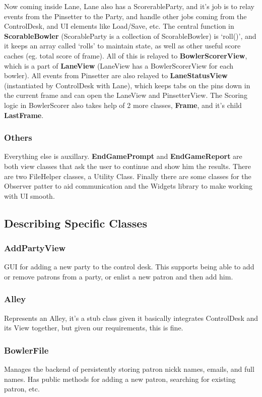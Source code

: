 Now coming inside Lane, Lane also has a ScorerableParty, and it's job is to relay events from the Pinsetter to the Party, and handle other jobs coming from the ControlDesk, and UI elements like Load/Save, etc. The central function in \textbf{ScorableBowler} (ScorableParty is a collection of ScorableBowler) is `roll()', and it keeps an array called `rolls' to maintain state, as well as other useful score caches (eg. total score of frame). All of this is relayed to \textbf{BowlerScorerView}, which is a part of \textbf{LaneView} (LaneView has a BowlerScorerView for each bowler). All events from Pinsetter are also relayed to \textbf{LaneStatusView} (instantiated by ControlDesk with Lane), which keeps tabs on the pins down in the current frame and can open the LaneView and PinsetterView. The Scoring logic in BowlerScorer also takes help of 2 more classes, \textbf{Frame}, and it's child \textbf{LastFrame}.

\subsubsection{Others}

Everything else is auxillary. \textbf{EndGamePrompt} and \textbf{EndGameReport} are both view classes that ask the user to continue and show him the results. There are two FileHelper classes, a Utility Class.
Finally there are some classes for the Observer patter to aid communication and the Widgets library to make working with UI smooth.

\subsection{Describing Specific Classes}

\subsubsection{AddPartyView}
GUI for adding a new party to the control desk. This supports being able to add or remove patrons from a party, or enlist a new patron and then add him.

\subsubsection{Alley}
Represents an Alley, it's a stub class given it basically integrates ControlDesk and its View together, but given our requirements, this is fine.

\subsubsection{BowlerFile}
Manages the backend of persistently storing patron nickk names, emails, and full names. Has public methods for adding a new patron, searching for existing patron, etc.

